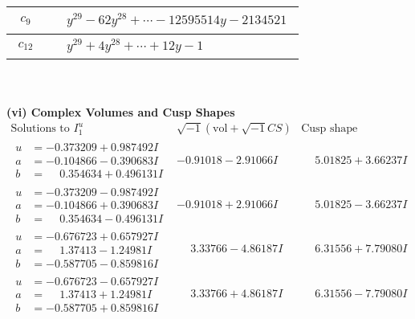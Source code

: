 \documentclass[1p]{elsarticle_modified}
\theoremstyle{definition}
\newcommand{\I}{\sqrt{-1}}
\begin{document}
\begin{tabular}{m{50pt}|m{274pt}}
\hline $$\begin{aligned}c_{9}\end{aligned}$$&$\begin{aligned}
&y^{29}-62 y^{28}+\cdots-12595514 y-2134521
\end{aligned}$\\
\hline $$\begin{aligned}c_{12}\end{aligned}$$&$\begin{aligned}
&y^{29}+4 y^{28}+\cdots+12 y-1
\end{aligned}$\\
\hline
\end{tabular}\\~\\
\newpage\flushleft \textbf{(vi) Complex Volumes and Cusp Shapes}
$$\begin{array}{c|c|c}  
\text{Solutions to }I^u_{1}& \I (\text{vol} + \sqrt{-1}CS) & \text{Cusp shape}\\
 \hline 
\begin{aligned}
u &= -0.373209 + 0.987492 I \\
a &= -0.104866 - 0.390683 I \\
b &= \phantom{-}0.354634 + 0.496131 I\end{aligned}
 & -0.91018 - 2.91066 I & \phantom{-}5.01825 + 3.66237 I \\ \hline\begin{aligned}
u &= -0.373209 - 0.987492 I \\
a &= -0.104866 + 0.390683 I \\
b &= \phantom{-}0.354634 - 0.496131 I\end{aligned}
 & -0.91018 + 2.91066 I & \phantom{-}5.01825 - 3.66237 I \\ \hline\begin{aligned}
u &= -0.676723 + 0.657927 I \\
a &= \phantom{-}1.37413 - 1.24981 I \\
b &= -0.587705 - 0.859816 I\end{aligned}
 & \phantom{-}3.33766 - 4.86187 I & \phantom{-}6.31556 + 7.79080 I \\ \hline\begin{aligned}
u &= -0.676723 - 0.657927 I \\
a &= \phantom{-}1.37413 + 1.24981 I \\
b &= -0.587705 + 0.859816 I\end{aligned}
 & \phantom{-}3.33766 + 4.86187 I & \phantom{-}6.31556 - 7.79080 I \\ \hline\begin{aligned}

\end{aligned}
\end{array}$$
\end{document}
